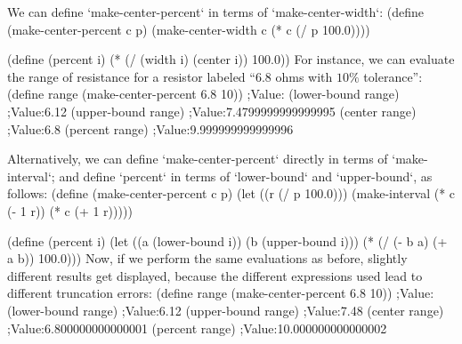 We can define `make-center-percent` in terms of `make-center-width`:
\begtt\scm
(define (make-center-percent c p)
  (make-center-width c (* c (/ p 100.0))))

(define (percent i)
  (* (/ (width i) (center i)) 100.0))
\endtt
For instance, we can evaluate the range of resistance for a resistor labeled “$6.8$ ohms with $10\%$ tolerance”:
\begtt\scm
(define range (make-center-percent 6.8 10))
;Value:
(lower-bound range)
;Value:6.12
(upper-bound range)
;Value:7.4799999999999995
(center range)
;Value:6.8
(percent range)
;Value:9.999999999999996
\endtt

Alternatively, we can define `make-center-percent` directly in terms of `make-interval`; and define `percent` in terms of `lower-bound` and `upper-bound`, as follows:
\begtt\scm
(define (make-center-percent c p)
  (let ((r (/ p 100.0)))
    (make-interval (* c (- 1  r)) (* c (+ 1  r)))))

(define (percent i)
  (let ((a (lower-bound i))
        (b (upper-bound i)))
    (* (/ (- b a) (+ a b)) 100.0)))
\endtt
Now, if we perform the same evaluations as before, slightly different results get displayed, because the different expressions used lead to different truncation errors:
\begtt\scm
(define range (make-center-percent 6.8 10))
;Value:
(lower-bound range)
;Value:6.12
(upper-bound range)
;Value:7.48
(center range)
;Value:6.800000000000001
(percent range)
;Value:10.000000000000002
\endtt

